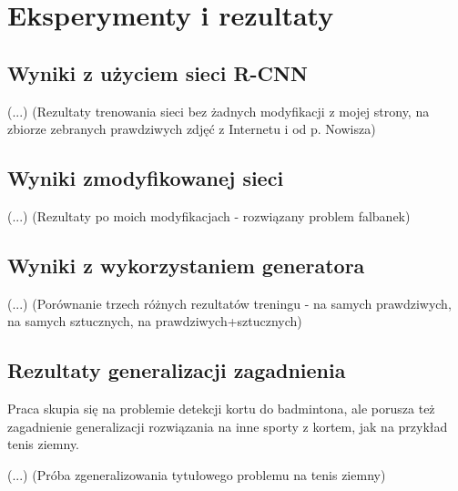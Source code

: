 \chapter{Eksperymenty i rezultaty}

\section{Wyniki z użyciem sieci R-CNN}

(...) (Rezultaty trenowania sieci bez żadnych modyfikacji z mojej strony, na zbiorze zebranych prawdziwych zdjęć z Internetu i od p. Nowisza)

\section{Wyniki zmodyfikowanej sieci}

(...) (Rezultaty po moich modyfikacjach - rozwiązany problem falbanek)

\section{Wyniki z wykorzystaniem generatora}

(...) (Porównanie trzech różnych rezultatów treningu - na samych prawdziwych, na samych sztucznych, na prawdziwych+sztucznych)

\section{Rezultaty generalizacji zagadnienia}
\label{sec:generalizacja}

Praca skupia się na problemie detekcji kortu do badmintona, ale porusza też zagadnienie generalizacji rozwiązania na inne sporty z kortem, jak na przykład tenis ziemny.

(...) (Próba zgeneralizowania tytułowego problemu na tenis ziemny)

